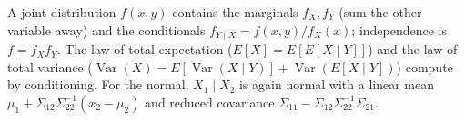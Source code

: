 \documentclass[11pt]{article}
\begin{document}
\begin{summarybox}
A joint distribution $f(x,y)$ contains the marginals $f_X,f_Y$ (sum the other
variable away) and the conditionals $f_{Y\mid X} = f(x,y)/f_X(x)$;
independence is $f = f_X f_Y$. The law of total expectation
($E[X]=E[E[X\mid Y]]$) and the law of total variance
($\operatorname{Var}(X)=E[\operatorname{Var}(X\mid Y)]+\operatorname{Var}(E[X\mid Y])$)
compute by conditioning. For the normal, $X_1\mid X_2$ is again normal with a
linear mean $\mu_1+\Sigma_{12}\Sigma_{22}^{-1}(x_2-\mu_2)$ and reduced
covariance $\Sigma_{11}-\Sigma_{12}\Sigma_{22}^{-1}\Sigma_{21}$.
\end{summarybox}
\end{document}
